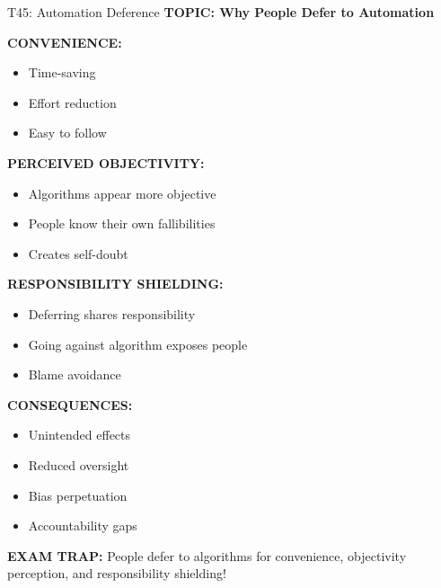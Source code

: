 \documentclass[8pt]{beamer}
\begin{document}
	\begin{frame}{T45: Automation Deference}
		\fontsize{6.5}{7.5}\selectfont
		\textbf{TOPIC: Why People Defer to Automation}
		
		\vspace{0.1cm}
		\textbf{CONVENIENCE:}
		\begin{itemize}
			\item Time-saving
			\item Effort reduction
			\item Easy to follow
		\end{itemize}
		
		\vspace{0.1cm}
		\textbf{PERCEIVED OBJECTIVITY:}
		\begin{itemize}
			\item Algorithms appear more objective
			\item People know their own fallibilities
			\item Creates self-doubt
		\end{itemize}
		
		\vspace{0.1cm}
		\textbf{RESPONSIBILITY SHIELDING:}
		\begin{itemize}
			\item Deferring shares responsibility
			\item Going against algorithm exposes people
			\item Blame avoidance
		\end{itemize}
		
		\vspace{0.1cm}
		\textbf{CONSEQUENCES:}
		\begin{itemize}
			\item Unintended effects
			\item Reduced oversight
			\item Bias perpetuation
			\item Accountability gaps
		\end{itemize}
		
		\textcolor{myred}{\textbf{EXAM TRAP:}} People defer to algorithms for \textcolor{myblue}{convenience, objectivity perception, and responsibility shielding}!
	\end{frame}
	
\end{document}
